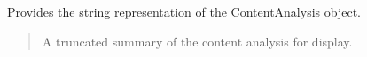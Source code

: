 \documentclass[letterpaper,10pt,english]{sphinxmanual}
\begin{document}
\begin{fulllineitems}
\begin{fulllineitems}
\label{\detokenize{source/meta_models_management:id2}}
\pysigstartsignatures
{}
\pysigstopsignatures
\sphinxAtStartPar
Provides the string representation of the ContentAnalysis object.
\begin{quote}\begin{description}
\sphinxAtStartPar
{} \textendash{} A truncated summary of the content analysis for display.

\end{description}\end{quote}

\end{fulllineitems}


\end{fulllineitems}

\end{document}
